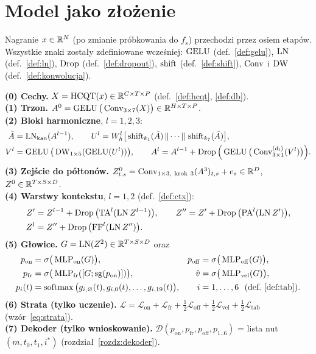 \section{Model jako złożenie}

Nagranie $x\in\mathbb{R}^N$ (po zmianie próbkowania do $f_s$) przechodzi przez osiem etapów. Wszystkie znaki zostały zdefiniowane wcześniej: $\operatorname{GELU}$ (def.~\ref{def:gelu}), $\operatorname{LN}$ (def.~\ref{def:ln}), $\operatorname{Drop}$ (def.~\ref{def:dropout}), $\operatorname{shift}$ (def.~\ref{def:shift}), $\operatorname{Conv}$ i $\operatorname{DW}$ (def.~\ref{def:konwolucja}).

\begin{definicja}\label{def:gen6}
\textbf{(0) Cechy.} $X=\mathrm{HCQT}(x)\in\mathbb{R}^{C\times T\times P}$ (def.~\ref{def:hcqt}, \ref{def:db}).\\
\textbf{(1) Trzon.} $A^{0}=\operatorname{GELU}\big(\operatorname{Conv}_{3\times7}(X)\big)\in\mathbb{R}^{H\times T\times P}$.\\
\textbf{(2) Bloki harmoniczne}, $l=1,2,3$:
\begin{align*}
\tilde A &= \operatorname{LN}_\mathrm{kan}(A^{l-1}),\qquad U^{l}=W_h^{l}\big[\operatorname{shift}_{k_1}(\tilde A)\,\Vert\cdots\Vert\,\operatorname{shift}_{k_7}(\tilde A)\big],\\
V^{l} &= \operatorname{GELU}\big(\operatorname{DW}_{1\times5}(\operatorname{GELU}(U^{l}))\big),\qquad
A^{l}=A^{l-1}+\operatorname{Drop}\Big(\operatorname{GELU}\big(\operatorname{Conv}^{(d_l)}_{3\times1}(V^{l})\big)\Big).
\end{align*}
\textbf{(3) Zejście do półtonów.} $Z^{0}_{t,s}=\Conv_{1\times3,\ \mathrm{krok\ }3}(A^{3})_{t,s}+e_s\in\R^{D}$, $Z^0\in\mathbb{R}^{T\times S\times D}$.\\
\textbf{(4) Warstwy kontekstu}, $l=1,2$ (def.~\ref{def:ctx}):
\begin{align*}
Z' &= Z^{l-1}+\operatorname{Drop}\big(\mathrm{TA}^{l}(\operatorname{LN} Z^{l-1})\big),\qquad Z''=Z'+\operatorname{Drop}\big(\mathrm{PA}^{l}(\operatorname{LN} Z')\big),\\
Z^{l} &= Z''+\operatorname{Drop}\big(\mathrm{FF}^{l}(\operatorname{LN} Z'')\big).
\end{align*}
\textbf{(5) Głowice.} $G=\operatorname{LN}(Z^{2})\in\mathbb{R}^{T\times S\times D}$ oraz
\begin{align*}
p_\mathrm{on} &= \sigma\big(\operatorname{MLP}_\mathrm{on}(G)\big), & p_\mathrm{off} &= \sigma\big(\operatorname{MLP}_\mathrm{off}(G)\big),\\
p_\mathrm{fr} &= \sigma\big(\operatorname{MLP}_\mathrm{fr}([G;\operatorname{sg}(p_\mathrm{on})])\big), & \hat v &= \sigma\big(\operatorname{MLP}_\mathrm{vel}(G)\big),\\
p_i(t) &= \operatorname{softmax}\big(g_{i,\varnothing}(t),g_{i,0}(t),\dots,g_{i,19}(t)\big), & i &=1,\dots,6\ \ (\text{def.~\ref{def:tab}}).
\end{align*}
\textbf{(6) Strata (tylko uczenie).} $\mathcal L=\mathcal L_\mathrm{on}+\mathcal L_\mathrm{fr}+\tfrac12\mathcal L_\mathrm{off}+\tfrac12\mathcal L_\mathrm{vel}+\tfrac12\mathcal L_\mathrm{tab}$ (wzór~\eqref{eq:strata}).\\
\textbf{(7) Dekoder (tylko wnioskowanie).} $\mathcal D(p_\mathrm{on},p_\mathrm{fr},p_\mathrm{off},p_{1..6})$ = lista nut $(m,t_0,t_1,i^\ast)$ (rozdział~\ref{rozdz:dekoder}).
\end{definicja}

